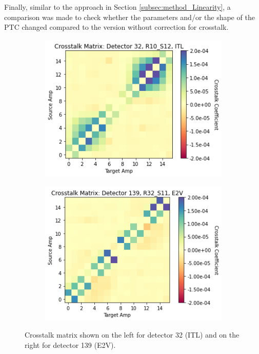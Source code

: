 Finally, similar to the approach in Section \ref{subsec:method_Linearity}, a comparison was made to check whether the parameters and/or the shape of the PTC changed compared to the version without correction for crosstalk.


\begin{figure}[!htb]
     \centering
     \begin{subfigure}[b]{0.49\textwidth}
         \centering
         \includegraphics[width=\textwidth]{Figures/Crosstalk_32.png}
     \end{subfigure}
     \hfill
     \begin{subfigure}[b]{0.49\textwidth}
         \centering
         \includegraphics[width=\textwidth]{Figures/Crosstalk_139.png}
     \end{subfigure}
        \caption{Crosstalk matrix shown on the left for detector 32 (ITL) and on the right for detector 139 (E2V).}
        \label{fig:crosstalk_matrix}
\end{figure}